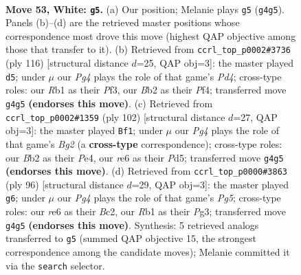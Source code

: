 \documentclass[11pt]{article}
\begin{document}
\clearpage

\begin{figure}[p]\centering
\begin{subfigure}{0.46\textwidth}\centering
\resizebox{\linewidth}{!}{%
\newchessgame
\chessboard[
  setfen={7k/3n4/4r3/8/p1p2KP1/P1P4p/1BP4P/1R6 w - - 11 53},
  showmover=false,
  pgfstyle=straightmove, color=movearrow, markmove={g4-g5}
]}
\caption{}
\end{subfigure}\hfill
\begin{subfigure}{0.46\textwidth}\centering
\resizebox{\linewidth}{!}{%
\newchessgame
\chessboard[
  setfen={8/8/ppBnpk2/8/P2P1P1p/3K1P1P/8/8 w - - 1 59},
  showmover=false,
  pgfstyle=straightmove, color=movearrow, markmove={d4-d5}
]}
\caption{}
\end{subfigure}
\\[4pt]
\begin{subfigure}{0.46\textwidth}\centering
\resizebox{\linewidth}{!}{%
\newchessgame
\chessboard[
  setfen={6k1/6p1/8/p2Pp2b/Pp2P2P/1P5P/6B1/6K1 w - - 0 52},
  showmover=false,
  pgfstyle=straightmove, color=movearrow, markmove={g2-f1}
]}
\caption{}
\end{subfigure}\hfill
\begin{subfigure}{0.46\textwidth}\centering
\resizebox{\linewidth}{!}{%
\newchessgame
\chessboard[
  setfen={6k1/2p2p2/p6K/P2P1PP1/1pn5/6P1/2B5/8 w - - 2 49},
  showmover=false,
  pgfstyle=straightmove, color=movearrow, markmove={g5-g6}
]}
\caption{}
\end{subfigure}
\caption{\textbf{Move 53, White: \texttt{g5}.} (a) Our position; Melanie plays \texttt{g5} (\texttt{g4g5}). Panels (b)--(d) are the retrieved master positions whose correspondence most drove this move (highest QAP objective among those that transfer to it). (b) Retrieved from \texttt{ccrl\_top\_p0002\#3736} (ply 116) [structural distance $d$=25, QAP obj=3]: the master played \texttt{d5}; under $\mu$ our \emph{Pg4} plays the role of that game's \emph{Pd4}; cross-type roles: our \emph{R}b1 as their \emph{P}f3, our \emph{B}b2 as their \emph{P}f4; transferred move \texttt{g4g5} \textbf{(endorses this move)}. (c) Retrieved from \texttt{ccrl\_top\_p0002\#1359} (ply 102) [structural distance $d$=27, QAP obj=3]: the master played \texttt{Bf1}; under $\mu$ our \emph{Pg4} plays the role of that game's \emph{Bg2} (a \textbf{cross-type} correspondence); cross-type roles: our \emph{B}b2 as their \emph{P}e4, our \emph{r}e6 as their \emph{P}d5; transferred move \texttt{g4g5} \textbf{(endorses this move)}. (d) Retrieved from \texttt{ccrl\_top\_p0000\#3863} (ply 96) [structural distance $d$=29, QAP obj=3]: the master played \texttt{g6}; under $\mu$ our \emph{Pg4} plays the role of that game's \emph{Pg5}; cross-type roles: our \emph{r}e6 as their \emph{B}c2, our \emph{R}b1 as their \emph{P}g3; transferred move \texttt{g4g5} \textbf{(endorses this move)}. Synthesis: 5 retrieved analogs transferred to \texttt{g5} (summed QAP objective 15, the strongest correspondence among the candidate moves); Melanie committed it via the \texttt{search} selector.}
\label{fig:thought-m104}
\end{figure}
\end{document}
